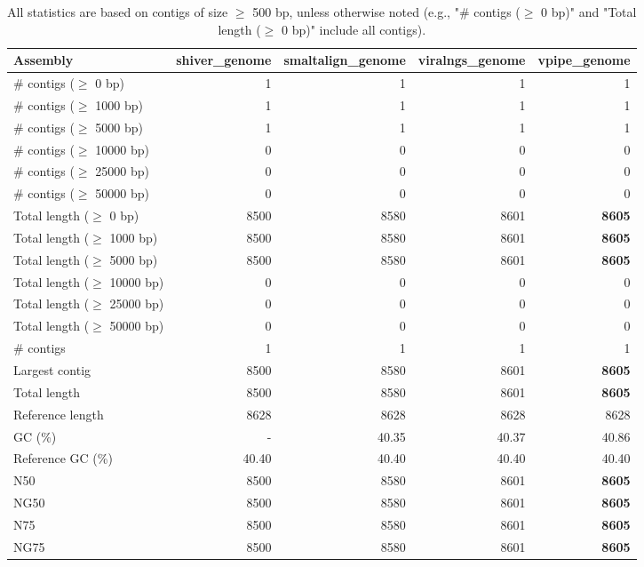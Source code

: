 \documentclass[12pt,a4paper]{article}
\begin{document}
\begin{table}[ht]
\begin{center}
\caption{All statistics are based on contigs of size $\geq$ 500 bp, unless otherwise noted (e.g., "\# contigs ($\geq$ 0 bp)" and "Total length ($\geq$ 0 bp)" include all contigs).}
\begin{tabular}{|l*{4}{|r}|}
\hline
Assembly & shiver\_genome & smaltalign\_genome & viralngs\_genome & vpipe\_genome \\ \hline
\# contigs ($\geq$ 0 bp) & 1 & 1 & 1 & 1 \\ \hline
\# contigs ($\geq$ 1000 bp) & 1 & 1 & 1 & 1 \\ \hline
\# contigs ($\geq$ 5000 bp) & 1 & 1 & 1 & 1 \\ \hline
\# contigs ($\geq$ 10000 bp) & 0 & 0 & 0 & 0 \\ \hline
\# contigs ($\geq$ 25000 bp) & 0 & 0 & 0 & 0 \\ \hline
\# contigs ($\geq$ 50000 bp) & 0 & 0 & 0 & 0 \\ \hline
Total length ($\geq$ 0 bp) & 8500 & 8580 & 8601 & {\bf 8605} \\ \hline
Total length ($\geq$ 1000 bp) & 8500 & 8580 & 8601 & {\bf 8605} \\ \hline
Total length ($\geq$ 5000 bp) & 8500 & 8580 & 8601 & {\bf 8605} \\ \hline
Total length ($\geq$ 10000 bp) & 0 & 0 & 0 & 0 \\ \hline
Total length ($\geq$ 25000 bp) & 0 & 0 & 0 & 0 \\ \hline
Total length ($\geq$ 50000 bp) & 0 & 0 & 0 & 0 \\ \hline
\# contigs & 1 & 1 & 1 & 1 \\ \hline
Largest contig & 8500 & 8580 & 8601 & {\bf 8605} \\ \hline
Total length & 8500 & 8580 & 8601 & {\bf 8605} \\ \hline
Reference length & 8628 & 8628 & 8628 & 8628 \\ \hline
GC (\%) & - & 40.35 & 40.37 & 40.86 \\ \hline
Reference GC (\%) & 40.40 & 40.40 & 40.40 & 40.40 \\ \hline
N50 & 8500 & 8580 & 8601 & {\bf 8605} \\ \hline
NG50 & 8500 & 8580 & 8601 & {\bf 8605} \\ \hline
N75 & 8500 & 8580 & 8601 & {\bf 8605} \\ \hline
NG75 & 8500 & 8580 & 8601 & {\bf 8605} \\ \hline

\end{tabular}
\end{center}
\end{table}
\end{document}
